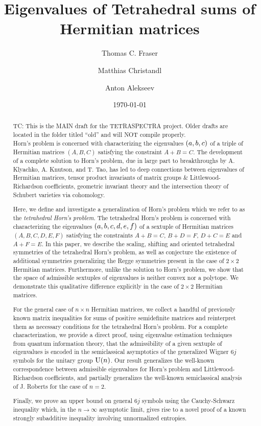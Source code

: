 \documentclass[notitlepage, 10pt]{article}
\author[1]{Thomas C. Fraser}
\author[1]{Matthias Christandl}
\author[2]{Anton Alekseev}
\affil[1]{\small{Department of Mathematical Sciences, University of Copenhagen, Universitetsparken 5, 2100 Denmark}}
\affil[2]{\small{Department of Mathematics, University of Geneva, 7-9 rue du Conseil Général, 1211 Geneva 4, Switzerland}}
\title{Eigenvalues of Tetrahedral sums of Hermitian matrices}
\date{\today}
\begin{document}
\maketitle

\begin{abstract}
    {\color{blue} TC: This is the MAIN draft for the TETRASPECTRA project.
    Older drafts are located in the folder titled ``old'' and will NOT compile properly.}\\
    Horn's problem is concerned with characterizing the eigenvalues $(a,b,c)$ of a triple of Hermitian matrices $(A,B,C)$ satisfying the constraint $A+B=C$.
    The development of a complete solution to Horn's problem, due in large part to breakthroughs by A. Klyachko, A. Knutson, and T. Tao, has led to deep connections between eigenvalues of Hermitian matrices, tensor product invariants of matrix groups \& Littlewood-Richardson coefficients, geometric invariant theory and the intersection theory of Schubert varieties via cohomology.
    
    Here, we define and investigate a generalization of Horn's problem which we refer to as the \textit{tetrahedral Horn's problem}.
    The tetrahedral Horn's problem is concerned with characterizing the eigenvalues $(a,b,c,d,e,f)$ of a sextuple of Hermitian matrices $(A,B,C,D,E,F)$ satisfying the constraints $A+B=C$, $B+D=F$, $D+C=E$ and $A+F=E$.
    In this paper, we describe the scaling, shifting and oriented tetrahedral symmetries of the tetrahedral Horn's problem, as well as conjecture the existence of additional symmetries generalizing the Regge symmetries present in the case of $2\times 2$ Hermitian matrices.
    Furthermore, unlike the solution to Horn's problem, we show that the space of admissible sextuples of eigenvalues is neither convex nor a polytope.
    We demonstrate this qualitative difference explicitly in the case of $2\times 2$ Hermitian matrices.

    For the general case of $n\times n$ Hermitian matrices, we collect a handful of previously known matrix inequalities for sums of positive semidefinite matrices and reinterpret them as necessary conditions for the tetrahedral Horn's problem.
    For a complete characterization, we provide a direct proof, using eigenvalue estimation techniques from quantum information theory, that the admissibility of a given sextuple of eigenvalues is encoded in the semiclassical asymptotics of the generalized Wigner $6j$ symbols for the unitary group $\operatorname{U}(n)$.
    Our result generalizes the well-known correspondence between admissible eigenvalues for Horn's problem and Littlewood-Richardson coefficients, and partially generalizes the well-known semiclassical analysis of J. Roberts for the case of $n=2$.
    
    Finally, we prove an upper bound on general $6j$ symbols using the Cauchy-Schwarz inequality which, in the $n\to \infty$ asymptotic limit, gives rise to a novel proof of a known strongly subadditive inequality involving unnormalized entropies.
\end{abstract}
\end{document}
